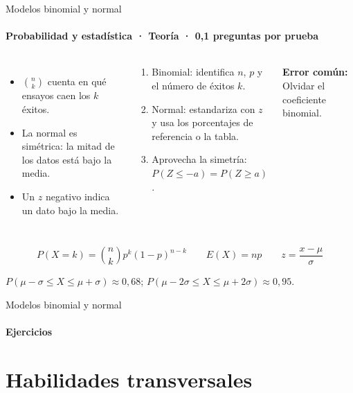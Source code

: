 \documentclass[aspectratio=169,11pt]{beamer}
\newlength{\ajustealto}
\newenvironment{ajustar}[1][0.74\textheight]
  {\setlength{\ajustealto}{#1}\begin{lrbox}{\ajustecaja}\begin{minipage}{\textwidth}}
  {\end{minipage}\end{lrbox}%
   \ifdim\dimexpr\ht\ajustecaja+\dp\ajustecaja\relax>\ajustealto
     \resizebox*{!}{\ajustealto}{\usebox{\ajustecaja}}\else\usebox{\ajustecaja}\fi}
\begin{document}
\begin{frame}{Modelos binomial y normal}
\label{tema-m2-modelos}
\framesubtitle{Probabilidad y estadística · Teoría · 0,1 preguntas por prueba}
\begin{ajustar}
\begin{columns}[T,onlytextwidth]
\begin{itemize}\footnotesize
\item $\binom{n}{k}$ cuenta en qué ensayos caen los $k$ éxitos.
\item La normal es simétrica: la mitad de los datos está bajo la media.
\item Un $z$ negativo indica un dato bajo la media.
\end{itemize}
\begin{cajaregla}\scriptsize \begin{enumerate}\item Binomial: identifica $n$, $p$ y el número de éxitos $k$.\item Normal: estandariza con $z$ y usa los porcentajes de referencia o la tabla.\item Aprovecha la simetría: $P(Z\le -a)=P(Z\ge a)$.\end{enumerate}\end{cajaregla}
\begin{notagris}\scriptsize \textbf{Error común:} Olvidar el coeficiente binomial.\end{notagris}
\end{columns}
\begin{cajaclave}[Fórmulas]\footnotesize
\[P(X=k)=\binom{n}{k}p^k(1-p)^{n-k} \quad\quad E(X)=np \quad\quad z=\frac{x-\mu}{\sigma}\]

$P(\mu-\sigma\le X\le\mu+\sigma)\approx 0{,}68$; $P(\mu-2\sigma\le X\le\mu+2\sigma)\approx 0{,}95$.
\end{cajaclave}
\end{ajustar}
\end{frame}

\begin{frame}{Modelos binomial y normal}
\framesubtitle{Ejercicios}
\vfill{}
\vfill
\end{frame}

\section{Habilidades transversales}
\end{document}
